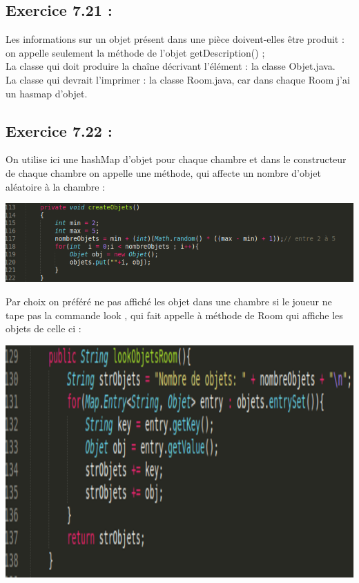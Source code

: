 \documentclass[french,10pt,a4paper]{report}
\begin{document}
\subsection{\textcolor{bb}{Exercice 7.21 :}}
Les informations sur un objet présent dans une pièce doivent-elles être produit : on appelle seulement la méthode de l’objet getDescription() ;\\
La classe qui doit produire la chaîne décrivant l'élément : la classe Objet.java.\\
La classe qui devrait l'imprimer : la classe Room.java, car dans chaque Room j’ai un hasmap d’objet.

\subsection{\textcolor{bb}{Exercice 7.22 :}}
On utilise ici une hashMap d’objet pour chaque chambre et dans le constructeur de chaque chambre  on appelle une méthode, qui affecte un nombre d’objet aléatoire à la chambre :
\begin{center}
	\includegraphics[scale=0.4]{captures/it2_7.png}
\end{center}
Par choix on préféré ne pas affiché les objet dans une chambre si le joueur ne tape pas la commande look , qui fait appelle à méthode de Room qui affiche les objets de celle ci :
\begin{center}
	\includegraphics[scale=0.3]{captures/it2_8.png}
\end{center}
\end{document}
